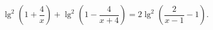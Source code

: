 \begin{ex}[type=equation]
	\begin{condition}
		$\lg^2 \left(1 + \dfrac{4}{x}\right) + \lg^2 \left(1 - \dfrac{4}{x + 4}\right) = 2\lg^2\left(\dfrac{2}{x - 1} - 1\right).$
	\end{condition}
\end{ex}